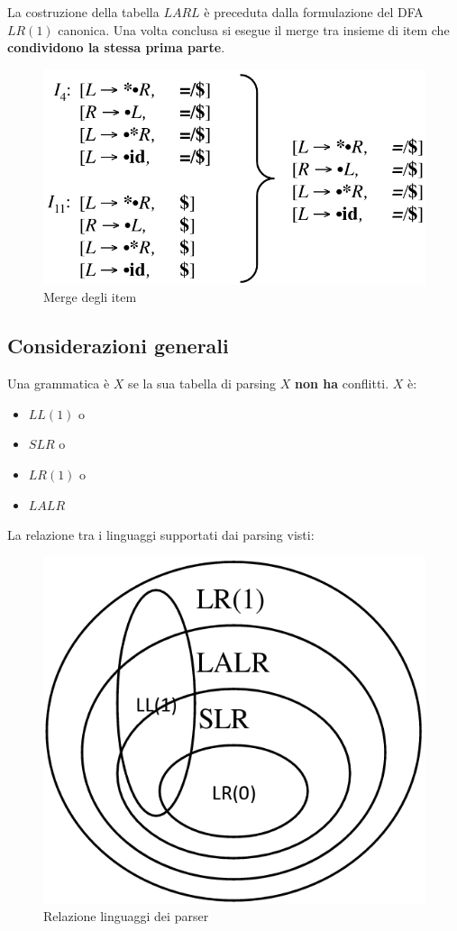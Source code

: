 La costruzione della tabella $LARL$ \`e preceduta dalla formulazione del DFA
$LR(1)$ canonica. Una volta conclusa si esegue il merge tra insieme di item che
\textbf{condividono la stessa prima parte}.

\begin{figure}[H]
\centering
\includegraphics[scale=0.5]{res/image/share_LALR}
\caption{Merge degli item}
\label{fig:share_LALR}
\end{figure}

\subsection{Considerazioni generali}
Una grammatica \`e $X$ se la sua tabella di parsing $X$ \textbf{non ha}
conflitti. $X$ \`e:
\begin{itemize}
\item $LL(1)$ o
\item $SLR$ o
\item $LR(1)$ o
\item $LALR$
\end{itemize}

La relazione tra i linguaggi supportati dai parsing visti:
\begin{figure}[H]
\centering
\includegraphics[scale=0.5]{res/image/relation_parser}
\caption{Relazione linguaggi dei parser}
\label{fig:relation_parser}
\end{figure}
